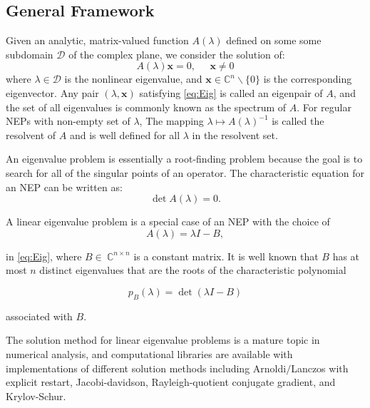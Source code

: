 \documentclass[11pt,letterpaper]{article}
\begin{document}
\pagebreak
\subsection{General Framework}
Given an analytic, matrix-valued function $A(\lambda)$ defined on some some subdomain $\mathcal{D}$ of the complex plane, we consider the solution of:
\begin{equation}\label{eq:Eig}
    A(\lambda) \mathbf{x} = 0,\;\;\;\;\;\mathbf{x}\neq 0
\end{equation}
where $\lambda \in \mathcal{D}$ is the nonlinear eigenvalue, and $\mathbf{x} \in \mathbb{C}^n\backslash\{0\}$ is the corresponding eigenvector. Any pair $(\lambda, \mathbf{x})$ satisfying \ref{eq:Eig} is called an eigenpair of $A$, and the set of all eigenvalues is commonly known as the spectrum of $A$. For regular NEPs with non-empty set of $\lambda$, The mapping $\lambda \mapsto A(\lambda)^{-1}$ is called the resolvent of $A$ and is well defined for all $\lambda$ in the resolvent set. 


An eigenvalue problem is essentially a root-finding problem because the goal is to search for all of the singular points of an operator. The characteristic equation for an NEP can be written as:
\begin{equation}\label{eq:charNEP}
\det A(\lambda) = 0. 
\end{equation}

A linear eigenvalue problem is a special case of an NEP with the choice of 
\begin{equation} 
\label{eq:LEP}
A(\lambda )= \lambda I - B,
\end{equation}

in \ref{eq:Eig}, where $B \in\ \mathbb{C}^{n \times n}$ is a constant matrix. It is well known that $B$ has at most $n$ distinct eigenvalues that are the roots of the characteristic polynomial

\begin{equation}
	\label{eq:charEP}
	p_{B}(\lambda)=\det(\lambda I -B)
\end{equation}  

associated with $B$. 

The solution method for linear eigenvalue problems is a mature topic in numerical analysis, and computational libraries are available with implementations of different solution methods including Arnoldi$/$Lanczos with explicit restart, Jacobi-davidson, Rayleigh-quotient conjugate gradient, and Krylov-Schur.  \citep{hernandez2005slepc} 
\end{document}
